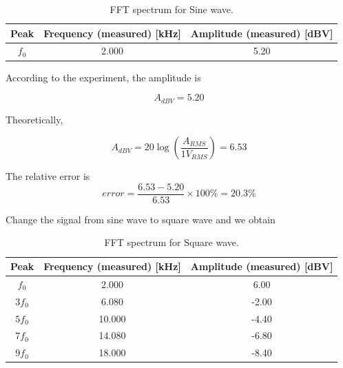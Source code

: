 \documentclass{article}
\begin{document}
\begin{table}[H]

\begin{center}

\begin{tabular}{|c|c|c|}

\hline

Peak & Frequency (measured) [kHz] & Amplitude (measured) [dBV] \\

\hline

$f_0$ &	2.000	&	5.20	\\

\hline

\end{tabular}

\caption{FFT spectrum for Sine wave.}

\label{tab-4}

\end{center}

\end{table}

According to the experiment, the amplitude is

$$A_{dBV}= 5.20$$



Theoretically,



$$A_{dBV}=20\log\left(\frac{A_{RMS}}{1V_{RMS}}\right)=6.53$$



The relative error is 
$$error = \frac{6.53-5.20}{6.53}\times 100\%=20.3\%$$

Change the signal from sine wave to square wave and we obtain
\begin{table}[H]
\begin{center}
\begin{tabular}{|c|c|c|}
\hline
Peak & Frequency (measured) [kHz] & Amplitude (measured) [dBV] \\
\hline
$f_0$  &	2.000	&	6.00	\\
\hline
$3f_0$ &	6.080	&	-2.00	\\
\hline
$5f_0$ &	10.000	&	-4.40 	\\
\hline
$7f_0$ &	14.080	&	 -6.80	\\
\hline
$9f_0$ &	18.000	&	 -8.40	\\
\hline
\end{tabular}
\caption{FFT spectrum for Square wave.}
\label{tab-5}
\end{center}
\end{table}
\end{document}
